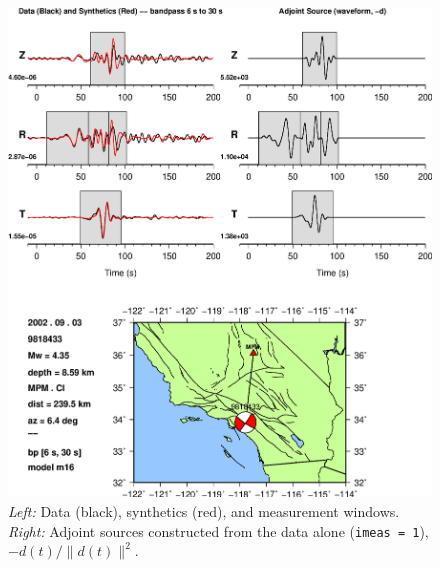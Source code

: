\documentclass[11pt,titlepage,fleqn]{article}
\begin{document}
\begin{figure}
\includegraphics[width=17cm]{9818433_T006_T030_MPM_CI_m16_iker01_win_adj.eps}
\caption[]
{{
{\em Left:} Data (black), synthetics (red), and measurement windows.
{\em Right:} Adjoint sources constructed from the data alone ({\tt imeas = 1}), $-d(t)/\|d(t)\|^2$.
\label{fig:iker01}
}}
\end{figure}
\end{document}
